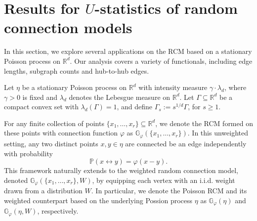 \documentclass{article}
\theoremstyle{definition}
\numberwithin{equation}{section}
\theoremstyle{remark}
\begin{document}
\section{Results for $U$-statistics of random connection models}\label{Sec:RCM}

In this section, we explore several applications on the RCM based on a stationary Poisson process on $\mathbb{R}^d$. Our analysis covers a variety of functionals, including edge lengths, subgraph counts and hub-to-hub edges. 

Let $\eta$ be a stationary Poisson process on $\mathbb{R}^d$ with intensity measure $\gamma\cdot \lambda_d$, where $\gamma>0$ is fixed and $\lambda_d$ denotes the Lebesgue measure on $\mathbb{R}^d$. 
Let $\Gamma\subseteq\mathbb{R}^d$ be a compact convex set with $\lambda_d(\Gamma)=1$, and define $\Gamma_s:=s^{1/d}\Gamma$, for $s\ge1$. 

For any finite collection of points $\{x_1,\dots,x_r\}\subseteq\mathbb{R}^d$, we denote the RCM formed on these points with connection function $\varphi$ as $\mathbb{G}_{\varphi}(\{x_1,\dots,x_r\})$. In this unweighted setting, any two distinct points $x,y\in\eta$ are connected be an edge independently with probability 
$$
\mathbb{P}(x\leftrightarrow y)=\varphi(x-y).
$$
This framework naturally extends to the weighted random connection model, denoted $\mathbb{G}_{\varphi}(\{x_1,\dots,x_r\},W)$, by equipping each vertex with an i.i.d. weight drawn from a distribution $W$. In particular, we denote the Poisson RCM and its weighted counterpart based on the underlying Possion process $\eta$ as $\mathbb{G}_{\varphi}(\eta)$ and $\mathbb{G}_{\varphi}(\eta,W)$, respectively. 

\end{document}

